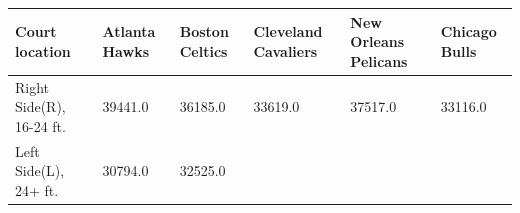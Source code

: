 \documentclass[]{article}
\begin{document}
\begin{longtable}[]{@{}llllll@{}}
\toprule
\begin{minipage}[b]{0.14\columnwidth}\raggedright
Court location\strut
\end{minipage} & \begin{minipage}[b]{0.14\columnwidth}\raggedright
Atlanta Hawks\strut
\end{minipage} & \begin{minipage}[b]{0.14\columnwidth}\raggedright
Boston Celtics\strut
\end{minipage} & \begin{minipage}[b]{0.14\columnwidth}\raggedright
Cleveland Cavaliers\strut
\end{minipage} & \begin{minipage}[b]{0.14\columnwidth}\raggedright
New Orleans Pelicans\strut
\end{minipage} & \begin{minipage}[b]{0.14\columnwidth}\raggedright
Chicago Bulls\strut
\end{minipage}\tabularnewline
\midrule
\endhead
\begin{minipage}[t]{0.14\columnwidth}\raggedright
Right Side(R), 16-24 ft.\strut
\end{minipage} & \begin{minipage}[t]{0.14\columnwidth}\raggedright
39441.0\strut
\end{minipage} & \begin{minipage}[t]{0.14\columnwidth}\raggedright
36185.0\strut
\end{minipage} & \begin{minipage}[t]{0.14\columnwidth}\raggedright
33619.0\strut
\end{minipage} & \begin{minipage}[t]{0.14\columnwidth}\raggedright
37517.0\strut
\end{minipage} & \begin{minipage}[t]{0.14\columnwidth}\raggedright
33116.0\strut
\end{minipage}\tabularnewline
\begin{minipage}[t]{0.14\columnwidth}\raggedright
Left Side(L), 24+ ft.\strut
\end{minipage} & \begin{minipage}[t]{0.14\columnwidth}\raggedright
30794.0\strut
\end{minipage} & \begin{minipage}[t]{0.14\columnwidth}\raggedright
32525.0\strut
\end{minipage} & \begin{minipage}[t]{0.14\columnwidth}\raggedright

\end{minipage}
\end{longtable}
\end{document}

